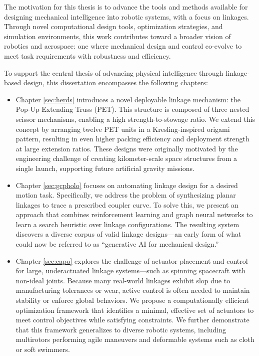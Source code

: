 The motivation for this thesis is to advance the tools and methods available for designing mechanical intelligence into robotic systems, with a focus on linkages. Through novel computational design tools, optimization strategies, and simulation environments, this work contributes toward a broader vision of robotics and aerospace: one where mechanical design and control co-evolve to meet task requirements with robustness and efficiency.

To support the central thesis of advancing physical intelligence through linkage-based design, this dissertation encompasses the following chapters:
\begin{itemize}
    \item Chapter \ref{sec:herds} introduces a novel deployable linkage mechanism: the Pop-Up Extending Truss (PET). This structure is composed of three nested scissor mechanisms, enabling a high strength-to-stowage ratio. We extend this concept by arranging twelve PET units in a Kresling-inspired origami pattern, resulting in even higher packing efficiency and deployment strength at large extension ratios. These designs were originally motivated by the engineering challenge of creating kilometer-scale space structures from a single launch, supporting future artificial gravity missions.
    \item Chapter \ref{sec:gcpholo} focuses on automating linkage design for a desired motion task. Specifically, we address the problem of synthesizing planar linkages to trace a prescribed coupler curve. To solve this, we present an approach that combines reinforcement learning and graph neural networks to learn a search heuristic over linkage configurations. The resulting system discovers a diverse corpus of valid linkage designs—an early form of what could now be referred to as “generative AI for mechanical design.”
    \item Chapter \ref{sec:capo} explores the challenge of actuator placement and control for large, underactuated linkage systems—such as spinning spacecraft with non-ideal joints. Because many real-world linkages exhibit slop due to manufacturing tolerances or wear, active control is often needed to maintain stability or enforce global behaviors. We propose a computationally efficient optimization framework that identifies a minimal, effective set of actuators to meet control objectives while satisfying constraints. We further demonstrate that this framework generalizes to diverse robotic systems, including multirotors performing agile maneuvers and deformable systems such as cloth or soft swimmers.

\end{itemize}
